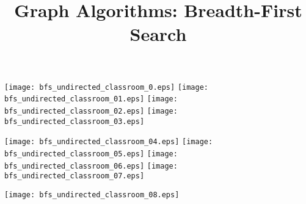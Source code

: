 \documentclass{article}
\title{Graph Algorithms: Breadth-First Search}
\begin{document}
\maketitle
{}\vspace{1em}


\vspace{1em}


\texttt{[image: bfs\_undirected\_classroom\_0.eps]}
\vspace{1em}
\texttt{[image: bfs\_undirected\_classroom\_01.eps]}
\vspace{1em}
\texttt{[image: bfs\_undirected\_classroom\_02.eps]}
\vspace{1em}
\texttt{[image: bfs\_undirected\_classroom\_03.eps]}
\vspace{1em}


\texttt{[image: bfs\_undirected\_classroom\_04.eps]}
\vspace{1em}
\texttt{[image: bfs\_undirected\_classroom\_05.eps]}
\vspace{1em}
\texttt{[image: bfs\_undirected\_classroom\_06.eps]}
\vspace{1em}
\texttt{[image: bfs\_undirected\_classroom\_07.eps]}
\vspace{1em}


\texttt{[image: bfs\_undirected\_classroom\_08.eps]}
\end{document}
